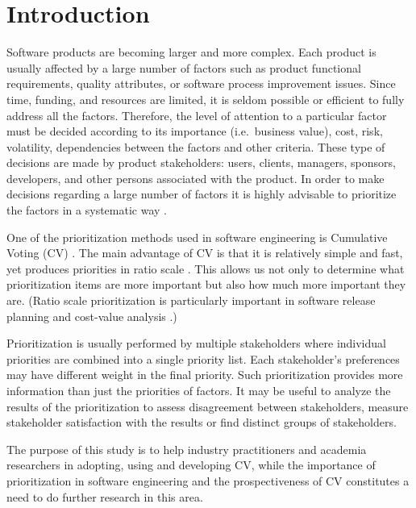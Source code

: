 \section{\label{intro}Introduction}

Software products are becoming larger and more complex. Each product
is usually affected by a large number of factors such as product functional
requirements, quality attributes, or software process improvement
issues. Since time, funding, and resources are limited, it is seldom
possible or efficient to fully address all the factors. Therefore,
the level of attention to a particular factor must be decided according
to its importance (i.e.\ business value), cost, risk, volatility, 
dependencies between the factors and other criteria. 
These type of decisions are made by product stakeholders:
users, clients, managers, sponsors, developers, and other persons
associated with the product. In order to make decisions regarding a
large number of factors it is highly advisable to prioritize the factors
in a systematic way \citep{Berander2005}.

One of the prioritization methods used in software engineering is Cumulative Voting (CV) \citep{Leffingwell1999}.
The main advantage of CV is that it is relatively simple and fast, yet produces priorities in ratio scale \citep{Berander2005,Ahl2005}.
This allows us not only to determine what prioritization items are more important but also how much more important they are.
(Ratio scale prioritization is particularly important in software release planning and cost-value analysis \citep{Berander2006a, Karlsson1997}.)

Prioritization is usually performed by multiple stakeholders 
where individual priorities are combined into a single priority list.
Each stakeholder's preferences may have different weight in the final priority.
Such prioritization provides more information than just the priorities of factors.
It may be useful to analyze the results of the prioritization to assess disagreement between stakeholders, measure stakeholder satisfaction with the results or find distinct groups of stakeholders.

The purpose of this study is to help industry practitioners and academia researchers in adopting, using and developing CV, while the importance of prioritization in software engineering and the prospectiveness of CV constitutes a need to do further research in this area.

